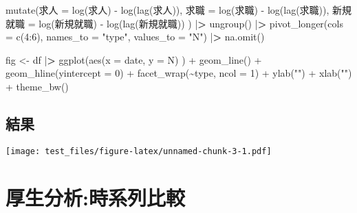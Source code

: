 \documentclass[
]{book}
\newenvironment{Shaded}{\begin{snugshade}}{\end{snugshade}}
\newcommand{\AttributeTok}[1]{\textcolor[rgb]{0.77,0.63,0.00}{#1}}
\newcommand{\DecValTok}[1]{\textcolor[rgb]{0.00,0.00,0.81}{#1}}
\newcommand{\ErrorTok}[1]{\textcolor[rgb]{0.64,0.00,0.00}{\textbf{#1}}}
\newcommand{\FunctionTok}[1]{\textcolor[rgb]{0.00,0.00,0.00}{#1}}
\newcommand{\NormalTok}[1]{#1}
\newcommand{\OtherTok}[1]{\textcolor[rgb]{0.56,0.35,0.01}{#1}}
\newcommand{\SpecialCharTok}[1]{\textcolor[rgb]{0.00,0.00,0.00}{#1}}
\newcommand{\StringTok}[1]{\textcolor[rgb]{0.31,0.60,0.02}{#1}}
\begin{document}
\begin{Shaded}
\begin{Highlighting}[]
  \FunctionTok{mutate}\NormalTok{(求人 }\OtherTok{=} \FunctionTok{log}\NormalTok{(求人) }\SpecialCharTok{{-}} \FunctionTok{log}\NormalTok{(}\FunctionTok{lag}\NormalTok{(求人)),}
\NormalTok{           求職 }\OtherTok{=} \FunctionTok{log}\NormalTok{(求職) }\SpecialCharTok{{-}} \FunctionTok{log}\NormalTok{(}\FunctionTok{lag}\NormalTok{(求職)),}
\NormalTok{           新規就職 }\OtherTok{=} \FunctionTok{log}\NormalTok{(新規就職) }\SpecialCharTok{{-}} \FunctionTok{log}\NormalTok{(}\FunctionTok{lag}\NormalTok{(新規就職))}
\NormalTok{           ) }\SpecialCharTok{|}\ErrorTok{\textgreater{}} 
  \FunctionTok{ungroup}\NormalTok{() }\SpecialCharTok{|}\ErrorTok{\textgreater{}} 
  \FunctionTok{pivot\_longer}\NormalTok{(}\AttributeTok{cols =} \FunctionTok{c}\NormalTok{(}\DecValTok{4}\SpecialCharTok{:}\DecValTok{6}\NormalTok{),}
               \AttributeTok{names\_to =} \StringTok{"type"}\NormalTok{,}
               \AttributeTok{values\_to =} \StringTok{"N"}\NormalTok{) }\SpecialCharTok{|}\ErrorTok{\textgreater{}} 
  \FunctionTok{na.omit}\NormalTok{()}

\NormalTok{fig }\OtherTok{\textless{}{-}}
\NormalTok{  df }\SpecialCharTok{|}\ErrorTok{\textgreater{}} 
  \FunctionTok{ggplot}\NormalTok{(}\FunctionTok{aes}\NormalTok{(}\AttributeTok{x =}\NormalTok{ date,}
             \AttributeTok{y =}\NormalTok{ N)}
\NormalTok{         ) }\SpecialCharTok{+}
  \FunctionTok{geom\_line}\NormalTok{() }\SpecialCharTok{+}
  \FunctionTok{geom\_hline}\NormalTok{(}\AttributeTok{yintercept =} \DecValTok{0}\NormalTok{) }\SpecialCharTok{+}
  \FunctionTok{facet\_wrap}\NormalTok{(}\SpecialCharTok{\textasciitilde{}}\NormalTok{type,}
             \AttributeTok{ncol =} \DecValTok{1}\NormalTok{) }\SpecialCharTok{+}
  \FunctionTok{ylab}\NormalTok{(}\StringTok{""}\NormalTok{) }\SpecialCharTok{+}
  \FunctionTok{xlab}\NormalTok{(}\StringTok{""}\NormalTok{) }\SpecialCharTok{+}
  \FunctionTok{theme\_bw}\NormalTok{()}
\end{Highlighting}
\end{Shaded}

\hypertarget{ux7d50ux679c}{%
\section{結果}\label{ux7d50ux679c}}

\texttt{[image: test\_files/figure-latex/unnamed-chunk-3-1.pdf]}

\hypertarget{ux539aux751fux5206ux6790ux6642ux7cfbux5217ux6bd4ux8f03}{%
\chapter{厚生分析:時系列比較}\label{ux539aux751fux5206ux6790ux6642ux7cfbux5217ux6bd4ux8f03}}
\end{document}
